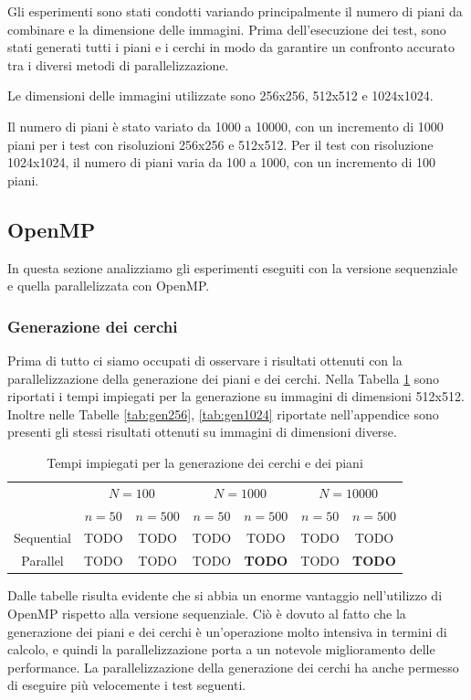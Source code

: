 Gli esperimenti sono stati condotti variando principalmente il numero di piani da combinare e la dimensione delle immagini.
Prima dell'esecuzione dei test, sono stati generati tutti i piani e i cerchi in modo da garantire un confronto accurato
tra i diversi metodi di parallelizzazione.\par
Le dimensioni delle immagini utilizzate sono 256x256, 512x512 e 1024x1024.

Il numero di piani è stato variato da 1000 a 10000, con un incremento di 1000 piani per i test con risoluzioni 256x256 e 512x512.
Per il test con risoluzione 1024x1024, il numero di piani varia da 100 a 1000, con un incremento di 100 piani.

\subsection{OpenMP}\label{subsec:test_openmp}
In questa sezione analizziamo gli esperimenti eseguiti con la versione sequenziale e quella parallelizzata con OpenMP.
\subsubsection{Generazione dei cerchi}
Prima di tutto ci siamo occupati di osservare i risultati ottenuti con la parallelizzazione della generazione dei piani e dei cerchi.
Nella Tabella \ref{tab:gen512} sono riportati i tempi impiegati per la generazione su immagini di dimensioni 512x512.
Inoltre nelle Tabelle \ref{tab:gen256}, \ref{tab:gen1024} riportate nell'appendice sono presenti gli stessi risultati ottenuti su immagini di dimensioni diverse.
\begin{table}[H]
    \centering
    \begin{tabular}{c|c|c|c|c|c|c|}
        & \multicolumn{2}{|c|}{$N = 100$} & \multicolumn{2}{|c|}{$N = 1000$} & \multicolumn{2}{|c|}{$N = 10000$} \\
        & $n=50$ & $n=500$ & $n=50$ & $n=500$ & $n=50$ & $n=500$ \\
        \hline
        Sequential & TODO & TODO & TODO & TODO & TODO & TODO \\
        Parallel & TODO & TODO & TODO & \textbf{TODO} & TODO & \textbf{TODO} \\
    \end{tabular}
    \caption{\label{tab:gen512}Tempi impiegati per la generazione dei cerchi e dei piani}
\end{table}
Dalle tabelle risulta evidente che si abbia un enorme vantaggio nell'utilizzo di OpenMP rispetto alla versione sequenziale.
Ciò è dovuto al fatto che la generazione dei piani e dei cerchi è un'operazione molto intensiva in termini di calcolo, e quindi la parallelizzazione porta a un notevole miglioramento delle performance.
La parallelizzazione della generazione dei cerchi ha anche permesso di eseguire più velocemente i test seguenti.


